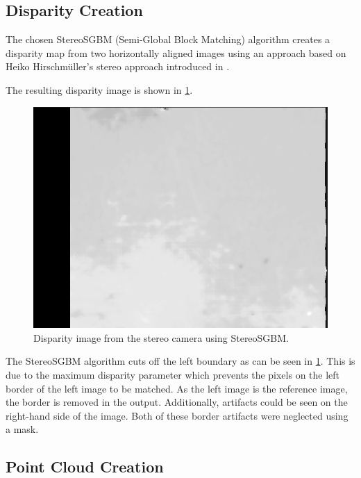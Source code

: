 \subsection{Disparity Creation}\label{subsec:disparity_creation}

The chosen StereoSGBM (Semi-Global Block Matching) algorithm creates a disparity map from two horizontally aligned images using an approach based on Heiko Hirschmüller's stereo approach introduced in \citep{Stereo}. 

The resulting disparity image is shown in \cref{fig:stereo_disp}.

\begin{figure}[h]
\centering
\includegraphics[scale=0.5]{images/stereo_camera_depth/stereo_disparity.png}
\caption{Disparity image from the stereo camera using StereoSGBM.}
\label{fig:stereo_disp}
\end{figure}

The StereoSGBM algorithm cuts off the left boundary as can be seen in \cref{fig:stereo_disp}. This is due to the maximum disparity parameter which prevents the pixels on the left border of the left image to be matched. As the left image is the reference image, the border is removed in the output. Additionally, artifacts could be seen on the right-hand side of the image. Both of these border artifacts were neglected using a mask.

\subsection{Point Cloud Creation}

